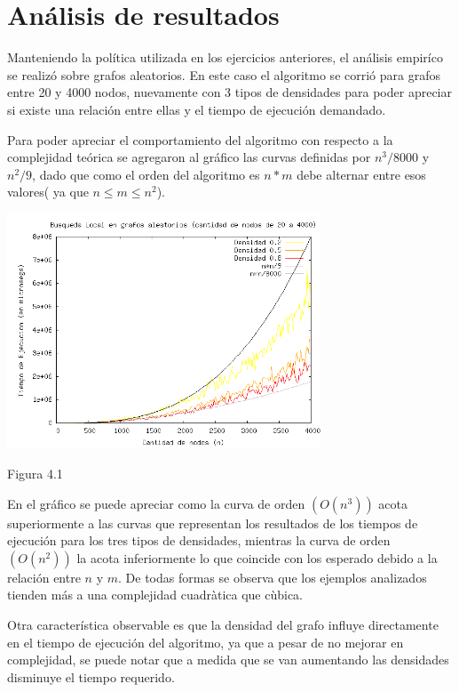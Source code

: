 \documentclass[a4paper,11pt] {article}
\begin{document}
\section*{An\'alisis de resultados}

Manteniendo la política utilizada en los ejercicios anteriores, el análisis empiríco se realizó sobre grafos aleatorios. En este caso el algoritmo se corrió para grafos entre 20 y 4000 nodos, nuevamente con 3 tipos de densidades
para poder apreciar si existe una relación entre ellas y el tiempo de ejecución demandado.

Para poder apreciar el comportamiento del algoritmo con respecto a la complejidad teórica se agregaron al gráfico las curvas definidas por $n^3/8000$ y $n^2/9$, dado que como el orden del algoritmo es $n * m$ debe alternar entre esos valores( ya que $n \leq m \leq n^2$).

\begin{center}
 \includegraphics[width=0.7\textwidth]{graficos/tiemposBL.png}
\begin{center}
Figura 4.1
\end{center}
\end{center}

En el gráfico se puede apreciar como la curva de orden $(O(n^3))$ acota superiormente a las curvas que representan los resultados de los tiempos de ejecución para los tres tipos de densidades, mientras la curva de orden $(O(n^2))$ la acota inferiormente lo que coincide con los esperado debido a la relación entre $n$ y $m$. De todas formas se observa que los ejemplos analizados tienden más a una complejidad cuadràtica que cùbica.

Otra característica observable es que la densidad del grafo influye directamente en el tiempo de ejecución del algoritmo, ya que a pesar de no mejorar en complejidad, se puede notar que a medida que se van aumentando las 
densidades disminuye el tiempo requerido. 
\end{document}

